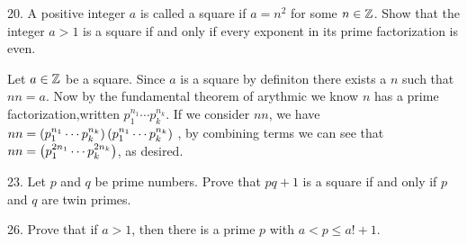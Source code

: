 \begin{mdframed}[style=darkAnswer,frametitle={Joe Starr}]
    
\end{mdframed}
\newpage
\begin{mdframed}[style=darkQuesion]
20. A positive integer $a$ is called a square if $a=n^2$ for some $n\in \mathbb{Z}$. 
Show that the integer $a>1$ is a square if and only if every exponent in its 
prime factorization is even. 
\end{mdframed}

\begin{mdframed}[style=darkAnswer,frametitle={Joe Starr}]
Let $a\in \mathbb{Z}$ be a square. Since $a$ is a square by definiton there exists 
a $n$ such that $nn=a$. Now by the fundamental theorem of arythmic we know $n$
has a prime factorization,written $p_1^{n_1}\cdots p_k^{n_k}$. If we consider 
$nn$, we have $nn = \left(p_1^{n_1}\cdots p_k^{n_k}\right)
                    \left(p_1^{n_1}\cdots p_k^{n_k}\right)$
, by combining terms we can see that $nn= \left(p_1^{2n_1}\cdots p_k^{2n_k}\right)$, as
desired. 
\end{mdframed}
\newpage
\begin{mdframed}[style=darkQuesion]
23. Let $p$ and $q$ be prime numbers. Prove that $pq+1$ is a square if and only 
if $p$ and $q$ are twin primes.
\end{mdframed}

\begin{mdframed}[style=darkAnswer,frametitle={Joe Starr}]
    
\end{mdframed}
\newpage
\begin{mdframed}[style=darkQuesion]
26. Prove that if $a>1$, then there is a prime $p$ with $a<p\leq a!+1$.
\end{mdframed}

